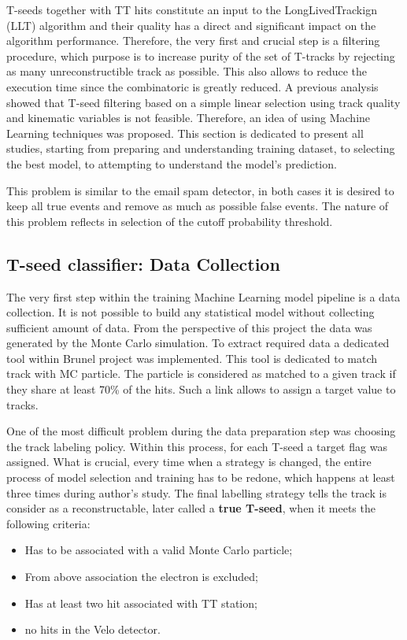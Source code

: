 T-seeds together with TT hits constitute an input to the LongLivedTrackign (LLT) algorithm and their quality has a direct and significant impact on the algorithm performance. Therefore, the very first and crucial step is a filtering procedure, which purpose is to increase purity of the set of T-tracks by rejecting as many unreconstructible track as possible. This also allows to reduce the execution time since the combinatoric is greatly reduced. A previous analysis showed that T-seed filtering based on a simple linear selection using track quality and kinematic variables is not feasible. Therefore, an idea of using Machine Learning techniques was proposed. This section is dedicated to present all studies, starting from preparing and understanding training dataset, to selecting the best model, to attempting to understand the model's prediction. 

This problem is similar to the email spam detector, in both cases it is desired to keep all true events and remove as much as possible false events. The nature of this problem reflects in selection of the cutoff probability threshold.  

\subsection{T-seed classifier: Data Collection} 

The very first step within the training Machine Learning model pipeline is a data collection. It is not possible to build any statistical model without collecting sufficient amount of data. From the perspective of this project the data was generated by the Monte Carlo simulation. To extract required data a dedicated tool within Brunel project was implemented. This tool is dedicated to match track with MC particle. The particle is considered as matched to a given track if they share at least 70\% of the hits. Such a link allows to assign a target value to tracks.    

One of the most difficult problem during the data preparation step was choosing the track labeling policy. Within this process, for each T-seed a target flag was assigned. What is crucial, every time when a strategy is changed, the entire process of model selection and training has to be redone, which happens at least three times during author's study. The final labelling strategy tells the track is consider as a reconstructable, later called a \textbf{true T-seed}, when it meets the following criteria:
\begin{itemize}
    \item Has to be associated with a valid Monte Carlo particle;
    \item From above association the electron is excluded; 
    \item Has at least two hit associated with TT station;
    \item no hits in the Velo detector. 
\end{itemize}

